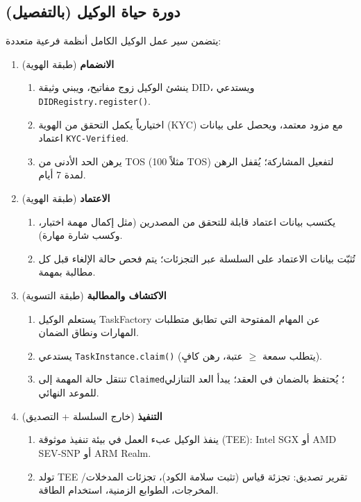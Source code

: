 \documentclass[11pt]{article}
\begin{document}
\subsection{دورة حياة الوكيل (بالتفصيل)}
يتضمن سير عمل الوكيل الكامل أنظمة فرعية متعددة:

\begin{enumerate}
  \item \textbf{الانضمام} (طبقة الهوية)
    \begin{enumerate}[label=\alph*.]
      \item ينشئ الوكيل زوج مفاتيح، ويبني وثيقة DID، ويستدعي \texttt{DIDRegistry.register()}.
      \item اختيارياً يكمل التحقق من الهوية (KYC) مع مزود معتمد، ويحصل على بيانات اعتماد \texttt{KYC-Verified}.
      \item يرهن الحد الأدنى من TOS (مثلاً 100 TOS) لتفعيل المشاركة؛ يُقفل الرهن لمدة 7 أيام.
    \end{enumerate}
  \item \textbf{الاعتماد} (طبقة الهوية)
    \begin{enumerate}[label=\alph*.]
      \item يكتسب بيانات اعتماد قابلة للتحقق من المصدرين (مثل إكمال مهمة اختبار، وكسب شارة مهارة).
      \item تُثبّت بيانات الاعتماد على السلسلة عبر التجزئات؛ يتم فحص حالة الإلغاء قبل كل مطالبة بمهمة.
    \end{enumerate}
  \item \textbf{الاكتشاف والمطالبة} (طبقة التسوية)
    \begin{enumerate}[label=\alph*.]
      \item يستعلم الوكيل TaskFactory عن المهام المفتوحة التي تطابق متطلبات المهارات ونطاق الضمان.
      \item يستدعي \texttt{TaskInstance.claim()} (يتطلب سمعة $\geq$ عتبة، رهن كافٍ).
      \item تنتقل حالة المهمة إلى \texttt{Claimed}؛ يُحتفظ بالضمان في العقد؛ يبدأ العد التنازلي للموعد النهائي.
    \end{enumerate}
  \item \textbf{التنفيذ} (خارج السلسلة + التصديق)
    \begin{enumerate}[label=\alph*.]
      \item ينفذ الوكيل عبء العمل في بيئة تنفيذ موثوقة (TEE): Intel SGX أو AMD SEV-SNP أو ARM Realm.
      \item تولد TEE تقرير تصديق: تجزئة قياس (تثبت سلامة الكود)، تجزئات المدخلات/المخرجات، الطوابع الزمنية، استخدام الطاقة.

\end{enumerate}
\end{enumerate}
\end{document}

